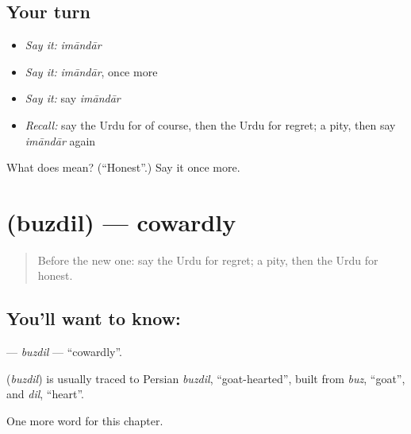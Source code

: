 \subsection*{Your turn}
\begin{itemize}
\raggedright
  \item \emph{Say it:} \emph{imāndār}
  \item \emph{Say it:} \emph{imāndār}, once more
  \item \emph{Say it:} say \emph{imāndār}
  \item \emph{Recall:} say the Urdu for of course, then the Urdu for regret; a pity, then say \emph{imāndār} again
\end{itemize}

\begin{tcolorbox}[breakable,colback=teal!4,colframe=teal!35!black,title={Before you move on}]
What does  mean? (\textquotedblleft{}Honest\textquotedblright{}.) Say it once more.
\end{tcolorbox}
\section[\texorpdfstring{\ur{بزدل} (buzdil)}{بزدل (buzdil)}]{ (buzdil) — cowardly}

\label{lesson:UR-C193-buzdil}



\begin{quote}
Before the new one: say the Urdu for regret; a pity, then the Urdu for honest.
\end{quote}

\subsection*{You'll want to know: }
\textbf{} — \emph{buzdil} — \textquotedblleft{}cowardly\textquotedblright{}.

\begin{cousinweb}
\textbf{} (\emph{buzdil}) is usually traced to Persian \emph{buzdil}, \textquotedblleft{}goat-hearted\textquotedblright{}, built from \emph{buz}, \textquotedblleft{}goat\textquotedblright{}, and \emph{dil}, \textquotedblleft{}heart\textquotedblright{}.
\end{cousinweb}

\begin{grammarlens}[title={What you've built}]
One more word for this chapter.
\end{grammarlens}

